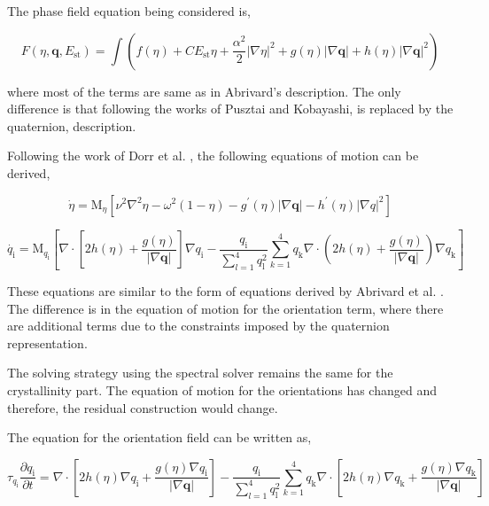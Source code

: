 \documentclass[a4paper,11pt,dvipsnames]{article}
\begin{document}
The phase field equation being considered is,

\begin{equation}
	F(\eta, \boldsymbol{q}, E_{\text{st}}) = \int \left ( f(\eta) + C E_{\text{st}} \eta + \frac{\alpha^2 }{2} | \nabla \eta | ^ 2 + g(\eta) | \nabla \boldsymbol{q} | + h(\eta) | \nabla \boldsymbol{q} | ^ 2 \right ) \label{eq:33}
\end{equation}

where most of the terms are same as in Abrivard's description. The only difference is that following the works of Pusztai and Kobayashi, \mathsym{\theta} is replaced by the quaternion,  description. 

Following the work of Dorr et al. \cite{Dorr2010}, the following equations of motion can be derived, 

\begin{equation}
	\dot{\eta} = \text{M}_{\eta} \left [ \nu^2 \nabla^2 \eta - \omega^2 ( 1 - \eta ) - g^{'} (\eta) | \nabla \boldsymbol{q} | - h^{'} (\eta) | \nabla q |^2 \right ] \label{eq:34}
\end{equation}

\begin{equation}
	\dot{q_{\text{i}}} = \text{M}_{q_\text{i}} \left [ \nabla \cdot \left [ 2h(\eta) + \frac{g(\eta)}{| \nabla \boldsymbol{q} |} \right ] \nabla q_{\text{i}} - \frac{q_{\text{i}}}{\sum_{l = 1}^{4} q_{\text{l}}^2} \sum_{k = 1}^{4} q_{\text{k}} \nabla \cdot \left ( 2h(\eta) + \frac{g(\eta)}{| \nabla \boldsymbol{q} | } \right ) \nabla q_{\text{k}} \right ] \label{eq:35} 
\end{equation}

These equations are similar to the form of equations derived by Abrivard et al. \cite{Abrivard2012b}. The difference is in the equation of motion for the orientation term, where there are additional terms due to the constraints imposed by the quaternion representation. 

The solving strategy using the spectral solver remains the same for the crystallinity part. 
The equation of motion for the orientations has changed and therefore, the residual construction would change. 

The equation for the orientation field can be written as, 

\begin{equation}
	\tau_{q_{\text{i}}} \frac{\partial q_{\text{i}}}{\partial t} = \nabla \cdot \left [ 2h(\eta) \nabla q_{\text{i}} + \frac{g(\eta) \nabla q_{\text{i}}}{| \nabla \boldsymbol{q} |} \right ] - \frac{q_{\text{i}}}{\sum_{l = 1}^{4} q_{\text{l}}^2} \sum_{k = 1}^{4} q_{\text{k}} \nabla \cdot \left [ 2h(\eta) \nabla q_{\text{k}} + \frac{g(\eta) \nabla q_{\text{k}}}{| \nabla \boldsymbol{q} |} \right ] \label{eq:36}
\end{equation} 
\end{document}
